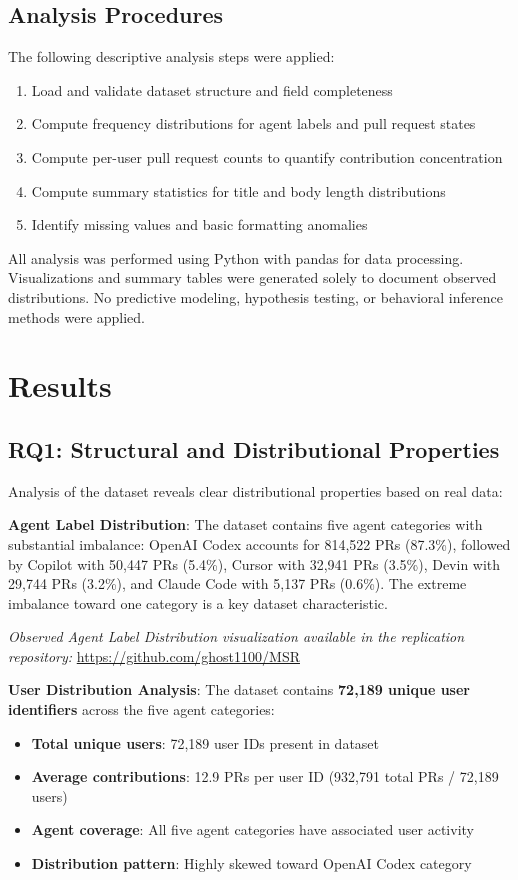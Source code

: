 \documentclass[conference]{IEEEtran}
\begin{document}
\subsection{Analysis Procedures}

The following descriptive analysis steps were applied:

\begin{enumerate}
    \item Load and validate dataset structure and field completeness
    \item Compute frequency distributions for agent labels and pull request states
    \item Compute per-user pull request counts to quantify contribution concentration
    \item Compute summary statistics for title and body length distributions
    \item Identify missing values and basic formatting anomalies
\end{enumerate}

All analysis was performed using Python with pandas for data processing. Visualizations and summary tables were generated solely to document observed distributions. No predictive modeling, hypothesis testing, or behavioral inference methods were applied.

\section{Results}

\subsection{RQ1: Structural and Distributional Properties}

Analysis of the dataset reveals clear distributional properties based on real data:

\textbf{Agent Label Distribution}: The dataset contains five agent categories with substantial imbalance: OpenAI Codex accounts for 814,522 PRs (87.3\%), followed by Copilot with 50,447 PRs (5.4\%), Cursor with 32,941 PRs (3.5\%), Devin with 29,744 PRs (3.2\%), and Claude Code with 5,137 PRs (0.6\%). The extreme imbalance toward one category is a key dataset characteristic.

\noindent\textit{Observed Agent Label Distribution visualization available in the replication repository:} \url{https://github.com/ghost1100/MSR}

\textbf{User Distribution Analysis}: The dataset contains \textbf{72,189 unique user identifiers} across the five agent categories:
\begin{itemize}
    \item \textbf{Total unique users}: 72,189 user IDs present in dataset
    \item \textbf{Average contributions}: 12.9 PRs per user ID (932,791 total PRs / 72,189 users)
    \item \textbf{Agent coverage}: All five agent categories have associated user activity
    \item \textbf{Distribution pattern}: Highly skewed toward OpenAI Codex category
\end{itemize}
\end{document}
